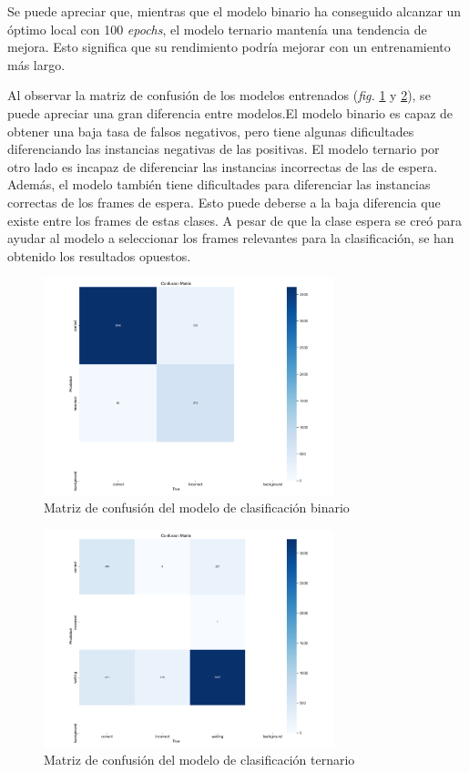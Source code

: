 \documentclass[12pt]{report} %
\begin{document}
    Se puede apreciar que, mientras que el modelo binario ha conseguido
    alcanzar un óptimo local con 100 \textit{epochs}, el modelo ternario
    mantenía una tendencia de mejora. Esto significa que su rendimiento podría
    mejorar con un entrenamiento más largo.

    Al observar la matriz de confusión de los modelos entrenados (\textit{fig.}
    \ref{mc1} y \ref{mc2}), se puede apreciar una gran diferencia entre
    modelos.El modelo binario es capaz de obtener una baja tasa de falsos
    negativos, pero tiene algunas dificultades diferenciando las instancias
    negativas de las positivas. El modelo ternario por otro lado es incapaz
    de diferenciar las instancias incorrectas de las de espera.  Además, el
    modelo también tiene dificultades para diferenciar las instancias correctas
    de los frames de espera. Esto puede deberse a la baja diferencia que existe
    entre los frames de estas clases. A pesar de que la clase espera se creó
    para ayudar al modelo a seleccionar los frames relevantes para la
    clasificación, se han obtenido los resultados opuestos.

    \begin{figure}[H]
    \includegraphics[width=0.75\textwidth]{confusion_matrix2.png}
    \caption  {Matriz de confusión del modelo de clasificación binario}
    \label{mc1}
    \end{figure}
    \begin{figure}[H]
    \includegraphics[width=0.75\textwidth]{confusion_matrix3.png}
    \caption  {Matriz de confusión del modelo de clasificación ternario}
    \label{mc2}
    \end{figure}
\end{document}

